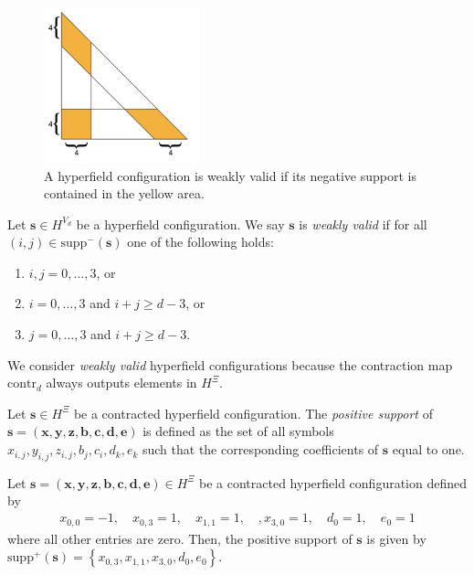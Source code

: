 \begin{figure}[H]
    \centering
    \includegraphics[width=0.4\textwidth]{assets/weakly-valid.png}
    \caption{A hyperfield configuration is weakly valid if its negative support is contained in the yellow area.}
\end{figure}

\begin{definition}
    Let \( \mathbf{s} \in H^{V_d} \) be a hyperfield configuration. We say \( \mathbf{s} \) is \emph{weakly valid} if for all \( (i,j) \in \mathrm{supp}^-(\mathbf{s}) \) one of the following holds:
    \begin{enumerate}
        \item \( i,j = 0, \dots, 3 \), or
        \item \( i = 0, \dots, 3 \) and \( i+j \geq d-3 \), or
        \item \( j = 0, \dots, 3 \) and \( i + j \geq d-3 \).
    \end{enumerate}
\end{definition}

We consider \emph{weakly valid} hyperfield configurations because the contraction map \( \mathrm{contr}_d \) always outputs elements in \( H^{\Xi} \).

\begin{definition}
    Let \( \mathbf{s} \in H^{\Xi} \) be a contracted hyperfield configuration. The \emph{positive support} of \( \mathbf{s} = (\mathbf{x}, \mathbf{y}, \mathbf{z}, \mathbf{b}, \mathbf{c}, \mathbf{d}, \mathbf{e}) \) is defined as the set of all symbols \( x_{i,j}, y_{i,j}, z_{i,j}, b_j, c_i, d_k, e_k \) such that the corresponding coefficients of \( \mathbf{s} \) equal to one.
\end{definition}

\begin{example}
    Let \( \mathbf{s} = (\mathbf{x}, \mathbf{y}, \mathbf{z}, \mathbf{b}, \mathbf{c}, \mathbf{d}, \mathbf{e}) \in H^{\Xi}\) be a contracted hyperfield configuration defined by 
    \begin{align*}
        x_{0,0} = -1, \quad x_{0,3} = 1, \quad x_{1,1} = 1, \quad, x_{3,0} = 1, \quad d_0 = 1, \quad e_0 = 1
    \end{align*}
    where all other entries are zero. Then, the positive support of \( \mathbf{s} \) is given by \( \mathrm{supp}^+(\mathbf{s}) = \left\{ x_{0,3}, x_{1,1}, x_{3,0}, d_0, e_0 \right\} \).
\end{example}